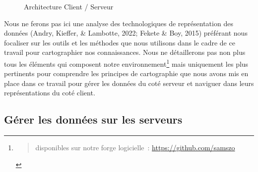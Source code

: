 \documentclass[
  a4paper,
  DIV=11,
  numbers=noendperiod]{scrreprt}
\begin{document}
\begin{figure}


\caption{\label{fig-ArchitectureClientServeur}Architecture Client /
Serveur}

\end{figure}%

Nous ne ferons pas ici une analyse des technologiques de représentation
des données (Andry, Kieffer, \& Lambotte, 2022; Fekete \& Boy, 2015)
préférant nous focaliser sur les outils et les méthodes que nous
utilisons dans le cadre de ce travail pour cartographier nos
connaissances. Nous ne détaillerons pas non plus tous les éléments qui
composent notre environnement\footnote{\begin{quote}
  disponibles sur notre forge logicielle~:
  \url{https://github.com/samszo}
  \end{quote}} mais uniquement les plus pertinents pour comprendre les
principes de cartographie que nous avons mis en place dans ce travail
pour gérer les données du coté serveur et naviguer dans leurs
représentations du coté client.

\subsection{Gérer les données sur les
serveurs}\label{sec-gestDonneesServeurs}
\end{document}
